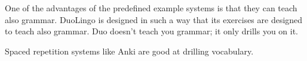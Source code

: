 One of the advantages of the predefined example systems is that they can teach also grammar. DuoLingo is designed in such a way that its exercises are designed to teach also grammar. Duo doesn't teach you grammar; it only drills you on it. 

Spaced repetition systems like Anki are good at drilling vocabulary.









